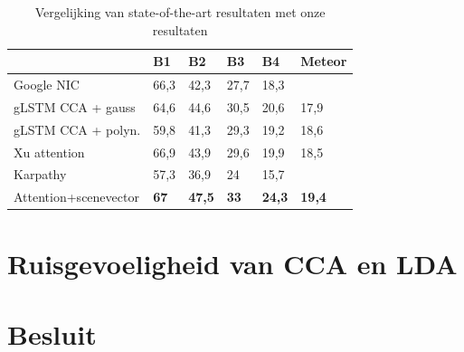 \begin{table}
	\centering
	\begin{tabular}{llllll}
		~                     & B1   & B2   & B3   & B4   & Meteor \\ \hline
		Google NIC\cite{Google}            & 66,3 & 42,3 & 27,7 & 18,3 & ~      \\
		gLSTM CCA + gauss\cite{Fernando2015}     & 64,6 & 44,6 & 30,5 & 20,6 & 17,9  \\
		gLSTM CCA + polyn.\cite{Fernando2015}    & 59,8 & 41,3 & 29,3 & 19,2 & 18,6  \\
		Xu attention\cite{Xu2015}         & 66,9 & 43,9 & 29,6 & 19,9 & 18,5  \\
		Karpathy\cite{Karpathy2015}              & 57,3 & 36,9 & 24   & 15,7 & ~      \\
		Attention+scenevector\cite{Jin2015} & \textbf{67}   & \textbf{47,5} & \textbf{33}   & \textbf{24,3} & \textbf{19,4}   \\\hline
	\end{tabular}
	\label{table:results_literature}
	\caption{Vergelijking van state-of-the-art resultaten met onze resultaten}
\end{table}

\section{Ruisgevoeligheid van CCA en LDA} %
\label{sec:ruisgevoeligheid_van_cca_en_lda_res}


\section{Besluit} %
\label{sec:besluit}



